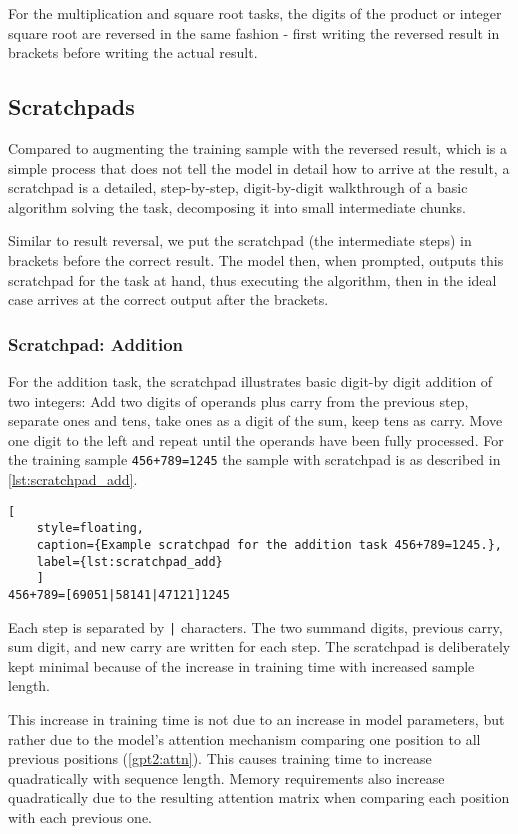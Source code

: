 For the multiplication and square root tasks, the digits of the product or integer square root are reversed in the same fashion - first writing the reversed result in brackets before writing the actual result.




\FloatBarrier
\subsection{Scratchpads}
\label{methods:scratchpad}


Compared to augmenting the training sample with the reversed result, which is a simple process that does not tell the model in detail how to arrive at the result, a scratchpad is a detailed, step-by-step, digit-by-digit walkthrough of a basic algorithm solving the task, decomposing it into small intermediate chunks.

Similar to result reversal, we put the scratchpad (the intermediate steps) in brackets before the correct result. The model then, when prompted, outputs this scratchpad for the task at hand, thus executing the algorithm, then in the ideal case arrives at the correct output after the brackets.

\subsubsection{Scratchpad: Addition}
\label{add_scratchpad}

For the addition task, the scratchpad illustrates basic digit-by digit addition of two integers: Add two digits of operands plus carry from the previous step, separate ones and tens, take ones as a digit of the sum, keep tens as carry. Move one digit to the left and repeat until the operands have been fully processed. For the training sample \verb!456+789=1245! the sample with scratchpad is as described in \cref{lst:scratchpad_add}.

\begin{lstlisting}[
	style=floating,
	caption={Example scratchpad for the addition task 456+789=1245.},
	label={lst:scratchpad_add}
	]
456+789=[69051|58141|47121]1245
\end{lstlisting}

Each step is separated by \verb!|! characters. The two summand digits, previous carry, sum digit, and new carry are written for each step.
The scratchpad is deliberately kept minimal because of the increase in training time with increased sample length.

\label{training_time_growth}
This increase in training time is not due to an increase in model parameters, but rather due to the model's attention mechanism comparing one position to all previous positions (\cref{gpt2:attn}). This causes training time to increase quadratically with sequence length. Memory requirements also increase quadratically due to the resulting attention matrix when comparing each position with each previous one.


